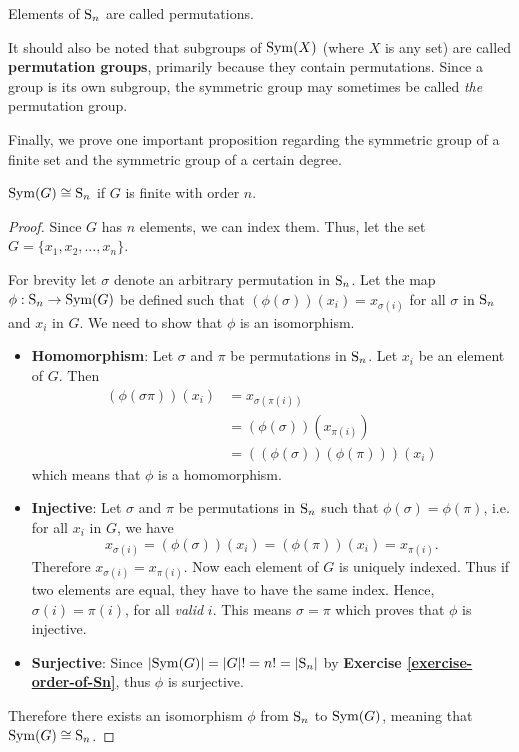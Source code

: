 \begin{remark}
    Elements of $\mathrm{S}_{n}$ are called permutations.
\end{remark}

It should also be noted that subgroups of $\mathrm{Sym}(X)$ (where $X$ is any set) are called \textbf{permutation groups}, primarily because they contain permutations. Since a group is its own subgroup, the symmetric group may sometimes be called \textit{the} permutation group.

Finally, we prove one important proposition regarding the symmetric group of a finite set and the symmetric group of a certain degree.
\begin{proposition}\label{prop-symmetric-group-of-finite-order}
    $\mathrm{Sym}(G) \cong \mathrm{S}_{n}$ if $G$ is finite with order $n$.
\end{proposition}
\begin{proof}
    Since $G$ has $n$ elements, we can index them. Thus, let the set $G = \{x_1, x_2, \dots, x_n\}$.

    For brevity let $\sigma$ denote an arbitrary permutation in $\mathrm{S}_{n}$. Let the map $\phi: \mathrm{S}_{n} \to \mathrm{Sym}(G)$ be defined such that $\left(\phi(\sigma)\right)(x_i) = x_{\sigma(i)}$ for all $\sigma$ in $\mathrm{S}_{n}$ and $x_i$ in $G$. We need to show that $\phi$ is an isomorphism.
    \begin{itemize}
        \item \textbf{Homomorphism}: Let $\sigma$ and $\pi$ be permutations in $\mathrm{S}_{n}$. Let $x_i$ be an element of $G$. Then
        \begin{align*}
            \left(\phi(\sigma \pi)\right)(x_i) &= x_{\sigma(\pi(i))}\\
            &= \left(\phi(\sigma)\right)\left(x_{\pi(i)}\right)\\
            &= \left(\left(\phi(\sigma)\right)\left(\phi(\pi)\right)\right)(x_i)
        \end{align*}
        which means that $\phi$ is a homomorphism.

        \item \textbf{Injective}: Let $\sigma$ and $\pi$ be permutations in $\mathrm{S}_{n}$ such that $\phi(\sigma) = \phi(\pi)$, i.e. for all $x_i$ in $G$, we have
        \[
            x_{\sigma(i)} = \left(\phi(\sigma)\right)(x_i) = \left(\phi(\pi)\right)(x_i) = x_{\pi(i)}.
        \]
        Therefore $x_{\sigma(i)} = x_{\pi(i)}$. Now each element of $G$ is uniquely indexed. Thus if two elements are equal, they have to have the same index. Hence, $\sigma(i) = \pi(i)$, for all \textit{valid} $i$. This means $\sigma = \pi$ which proves that $\phi$ is injective.

        \item \textbf{Surjective}: Since $|\mathrm{Sym}(G)| = |G|! = n! = |\mathrm{S}_{n}|$ by \textbf{Exercise \ref{exercise-order-of-Sn}}, thus $\phi$ is surjective.
    \end{itemize}

    Therefore there exists an isomorphism $\phi$ from $\mathrm{S}_{n}$ to $\mathrm{Sym}(G)$, meaning that $\mathrm{Sym}(G) \cong \mathrm{S}_{n}$.
\end{proof}

